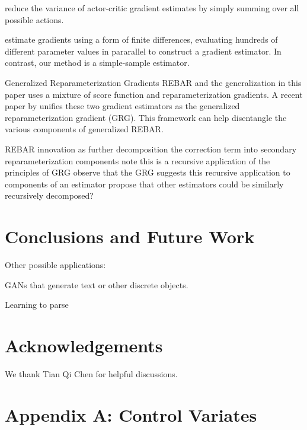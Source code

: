 \documentclass{article}
\begin{document}
\citet{asadi2017mean} reduce the variance of actor-critic gradient estimates by simply summing over all possible actions.

\citet{salimans2017evolution} estimate gradients using a form of finite differences, evaluating hundreds of different parameter values in pararallel to construct a gradient estimator.
In contrast, our method is a simple-sample estimator.

\par{Generalized Reparameterization Gradients}
REBAR and the generalization in this paper uses a mixture of score function and reparameterization gradients.
A recent paper by \cite{ruiz2016generalized} unifies these two gradient estimators as the generalized reparameterization gradient (GRG).
This framework can help disentangle the various components of generalized REBAR.

REBAR innovation as further decomposition the correction term into secondary reparameterization components
note this is a recursive application of the principles of GRG
observe that the GRG suggests this recursive application to components of an estimator
propose that other estimators could be similarly recursively decomposed?




\section{Conclusions and Future Work}
\label{conclusion}

Other possible applications:

GANs \citep{goodfellow2014generative} that generate text or other discrete objects.

Learning to parse \citep{kusner2017grammar}


\section*{Acknowledgements}
We thank Tian Qi Chen for helpful discussions.








\section{Appendix A: Control Variates}
\end{document}
